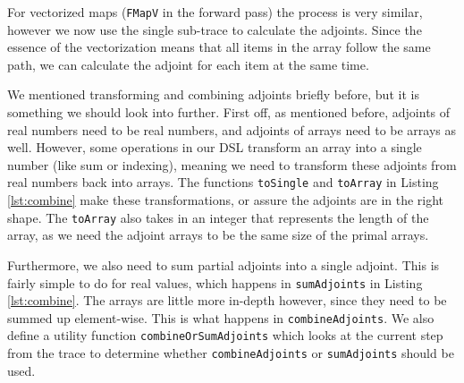         For vectorized maps (\texttt{FMapV} in the forward pass) the process is very similar, however we now use the single sub-trace to calculate the adjoints.
        Since the essence of the vectorization means that all items in the array follow the same path, we can calculate the adjoint for each item at the same time.

        We mentioned transforming and combining adjoints briefly before, but it is something we should look into further.
        First off, as mentioned before, adjoints of real numbers need to be real numbers, and adjoints of arrays need to be arrays as well.
        However, some operations in our DSL transform an array into a single number (like sum or indexing), meaning we need to transform these adjoints from real numbers back into arrays.
        The functions \texttt{toSingle} and \texttt{toArray} in Listing \ref{lst:combine} make these transformations, or assure the adjoints are in the right shape.
        The \texttt{toArray} also takes in an integer that represents the length of the array, as we need the adjoint arrays to be the same size of the primal arrays.

        Furthermore, we also need to sum partial adjoints into a single adjoint.
        This is fairly simple to do for real values, which happens in \texttt{sumAdjoints} in Listing \ref{lst:combine}.
        The arrays are little more in-depth however, since they need to be summed up element-wise.
        This is what happens in \texttt{combineAdjoints}.
        We also define a utility function \texttt{combineOrSumAdjoints} which looks at the current step from the trace to determine whether \texttt{combineAdjoints} or \texttt{sumAdjoints} should be used.
        
